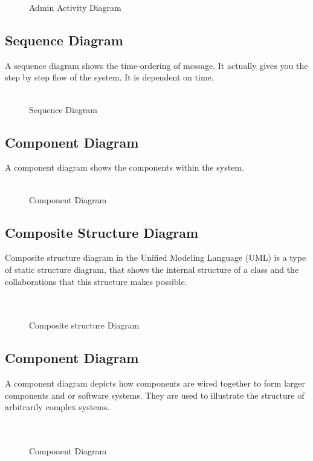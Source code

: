 \documentclass{SureshLimkar}
\begin{document}
\begin{figure}[h]%
\centering
{}%
\caption{Admin Activity Diagram}%
\label{Activity Diagram}%
\end{figure}


\newpage
\subsection{Sequence Diagram}
 A sequence diagram shows the time-ordering of message. It actually gives you the step by step flow of the system. It is dependent on time.\\ \\

 \begin{figure}[h]%
\centering
{}%
\caption{Sequence Diagram}%
\label{Sequence Diagram}%
\end{figure}

\newpage
\subsection{Component Diagram}
A component diagram shows the components within the system. \\ \\
\begin{figure}[h]%
\centering
{}%
\caption{Component Diagram}%
\label{Component Diagram}%
\end{figure}
\newpage
\subsection{Composite Structure Diagram}
Composite structure diagram in the Unified Modeling Language (UML) is a type of static structure diagram, that shows the internal structure of a class and the collaborations that this structure makes possible.\\ \\ \\

\begin{figure}[h]%
\centering
{}%
\caption{Composite structure Diagram}%
\label{Composite Structure Diagram}%
\end{figure}
\newpage

\subsection{Component Diagram}
 A component diagram depicts how components are wired together to form larger components and or software systems. They are used to illustrate the structure of arbitrarily complex systems.\\ \\ \\
\begin{figure}[h]%
\centering
{}%
\caption{Component Diagram}%
\label{Component Diagram}%
\end{figure}
\newpage
\end{document}
